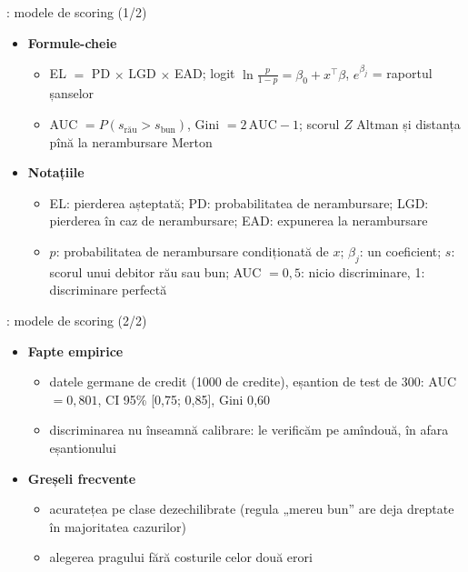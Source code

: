 \begin{frame}{: modele de scoring (1/2)}
\itemsize{\small}
\begin{itemize}
    \item \textbf{Formule-cheie}
    \begin{itemize}
        \item EL $=$ PD $\times$ LGD $\times$ EAD; logit $\ln\frac{p}{1-p} = \beta_0 + x^\top\beta$, $e^{\beta_j}$ = raportul șanselor
        \item AUC $= P(s_{\text{rău}} > s_{\text{bun}})$, Gini $= 2\,\mathrm{AUC} - 1$; scorul $Z$ Altman și distanța pînă la nerambursare Merton 
    \end{itemize}
    \item \textbf{Notațiile}
    \begin{itemize}
        \item EL: pierderea așteptată; PD: probabilitatea de nerambursare; LGD: pierderea în caz de nerambursare; EAD: expunerea la nerambursare
        \item $p$: probabilitatea de nerambursare condiționată de $x$; $\beta_j$: un coeficient; $s$: scorul unui debitor rău sau bun; AUC $= 0{,}5$: nicio discriminare, 1: discriminare perfectă
    \end{itemize}
\end{itemize}
\end{frame}

\begin{frame}{: modele de scoring (2/2)}
\itemsize{\small}
\begin{itemize}
    \item \textbf{Fapte empirice}
    \begin{itemize}
        \item datele germane de credit (1000 de credite), eșantion de test de 300: AUC $= 0{,}801$, CI 95\% [0{,}75; 0{,}85], Gini 0{,}60
        \item discriminarea nu înseamnă calibrare: le verificăm pe amîndouă, în afara eșantionului
    \end{itemize}
    \item \textbf{Greșeli frecvente}
    \begin{itemize}
        \item acuratețea pe clase dezechilibrate (regula „mereu bun” are deja dreptate în majoritatea cazurilor)
        \item alegerea pragului fără costurile celor două erori
    \end{itemize}
\end{itemize}
\end{frame}

